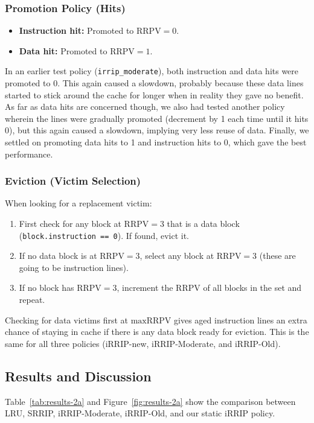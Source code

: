 \documentclass[11pt,a4paper]{article}
\begin{document}
\subsubsection{Promotion Policy (Hits)}
\begin{itemize}
    \item \textbf{Instruction hit:} Promoted to $\text{RRPV} = 0$.
    \item \textbf{Data hit:} Promoted to $\text{RRPV} = 1$.
\end{itemize}
In an earlier test policy (\texttt{irrip\_moderate}), both instruction and data hits were promoted to 0. This again caused a slowdown, probably because these data lines started to stick around the cache for longer when in reality they gave no benefit. As far as data hits are concerned though, we also had tested another policy wherein the lines were gradually promoted (decrement by 1 each time until it hits 0), but this again caused a slowdown, implying very less reuse of data. Finally, we settled on promoting data hits to 1 and instruction hits to 0, which gave the best performance.

\subsubsection{Eviction (Victim Selection)}
When looking for a replacement victim:
\begin{enumerate}
    \item First check for any block at $\text{RRPV} = 3$ that is a data block (\texttt{block.instruction == 0}). If found, evict it.
    \item If no data block is at $\text{RRPV} = 3$, select any block at $\text{RRPV} = 3$ (these are going to be instruction lines).
    \item If no block has $\text{RRPV} = 3$, increment the RRPV of all blocks in the set and repeat.
\end{enumerate}
Checking for data victims first at $\text{maxRRPV}$ gives aged instruction lines an extra chance of staying in cache if there is any data block ready for eviction. This is the same for all three policies (iRRIP-new, iRRIP-Moderate, and iRRIP-Old).

\subsection{Results and Discussion}
Table~\ref{tab:results-2a} and Figure~\ref{fig:results-2a} show the comparison between LRU, SRRIP, iRRIP-Moderate, iRRIP-Old, and our static iRRIP policy.
\end{document}
